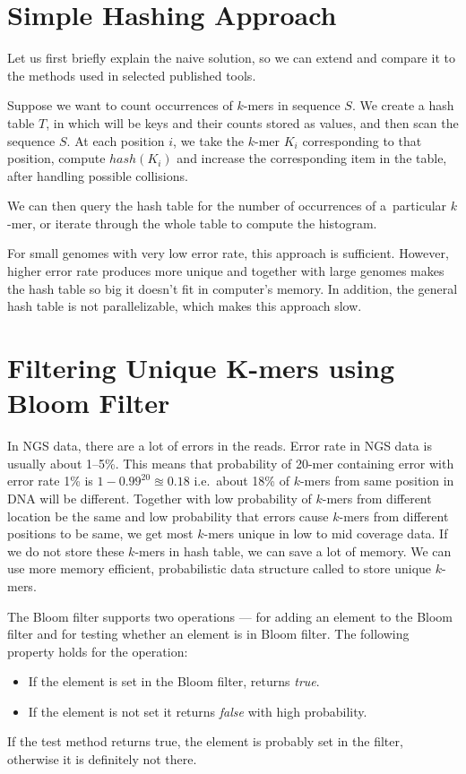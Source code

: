 \section{Simple Hashing Approach}

Let us first briefly explain the naive solution, so we can extend and compare it to the methods used in selected published tools.

Suppose we want to count occurrences of $k$-mers in sequence $S$.
We create a hash table $T$, in which \kmers will be keys and their counts stored as values, and then scan the sequence $S$.
At each position $i$, we take the $k$-mer $K_i$ corresponding to that  position, compute $hash(K_i)$ and increase the corresponding item in the table, after handling possible collisions.

We can then query the hash table for the number of occurrences of a~particular $k$-mer, or iterate through the whole table to compute the histogram.

For small genomes with very low error rate, this approach is sufficient. However, higher error rate produces more unique \kmers and together with large genomes makes the hash table so big it doesn't fit in computer's memory. In addition, the general hash table is not parallelizable, which makes this approach slow.

\section{Filtering Unique K-mers using Bloom Filter}

In NGS data, there are a lot of errors in the reads. Error rate in NGS data is usually about 1--5\%. This means that probability of 20-mer containing error with error rate 1\% is $1 - 0.99^{20} \approxeq 0.18$ i.e.\ about 18\% of $k$-mers from same position in DNA will be different. Together with low probability of $k$-mers from different location be the same and low probability that errors cause $k$-mers from different positions to be same, we get most $k$-mers unique in low to mid coverage data. If we do not store these $k$-mers in hash table, we can save a lot of memory. We can use more memory efficient, probabilistic data structure called \cite{bloomfilter} to store unique $k$-mers.

The Bloom filter supports two operations ---  for adding an element to the Bloom filter and  for testing whether an element is in Bloom filter. The following property holds for the  operation:
\begin{itemize}
  \item If the element is set in the Bloom filter, returns \emph{true}.
  \item If the element is not set it returns \emph{false} with high probability.
\end{itemize}
If the test method returns true, the element is probably set in the filter, otherwise it is definitely not there.

